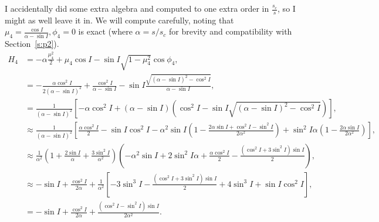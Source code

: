 \documentclass[11pt,
        usenames, %
        dvipsnames %
    ]{article}
\newcommand*{\p}[1]{\left(#1\right)}
\newcommand*{\s}[1]{\left[#1\right]}
\begin{document}
I accidentally did some extra algebra and computed to one extra order in
$\frac{s_c}{s}$, so I might as well leave it in. We will compute carefully,
noting that $\mu_4 = \frac{\cos I}{\alpha - \sin I}, \phi_4 = 0$ is exact (where
$\alpha = s/s_c$ for brevity and compatibility with Section~\ref{s:p2}).
\begin{align*}
    H_4 &= -\alpha \frac{\mu_4^2}{2} + \mu_4 \cos I - \sin I \sqrt{1 - \mu_4^2}
            \cos \phi_4,\\
        &= -\frac{\alpha \cos^2 I}{2(\alpha - \sin I)^2}
            + \frac{\cos^2 I}{\alpha - \sin I}
            - \sin I \frac{\sqrt{(\alpha - \sin I)^2 - \cos^2 I}}{
                \alpha - \sin I},\\
        &= \frac{1}{\p{\alpha - \sin I}^2}
            \s{-\alpha \cos^2 I + \p{\alpha - \sin I}
                \p{\cos^2 I - \sin I \sqrt{
                    (\alpha - \sin I)^2 - \cos^2 I}}},\\
        &\approx \frac{1}{\p{\alpha - \sin I}^2}
            \s{\frac{\alpha \cos^2 I}{2} -\sin I \cos^2 I - \alpha^2 \sin I
                \p{1 - \frac{2\alpha \sin I + \cos^2 I - \sin^2 I}{2\alpha^2}}
                + \sin^2 I\alpha\p{1 - \frac{2\alpha \sin I}{2\alpha^2}}},\\
        &\approx \frac{1}{\alpha^2}\p{1 + \frac{2\sin I}{\alpha}
            + \frac{3\sin^2 I}{\alpha^2}}\p{
                -\alpha^2 \sin I + 2\sin^2 I\alpha
                    + \frac{\alpha \cos^2 I}{2}
                    - \frac{(\cos^2 I + 3\sin^2 I)\sin I}{2}},\\
        &\approx -\sin I + \frac{\cos^2 I}{2\alpha}
            + \frac{1}{\alpha^2}\s{
                -3\sin^3 I - \frac{\p{\cos^2 I + 3\sin^2 I}\sin I}{2}
                    + 4\sin^3 I + \sin I \cos^2 I},\\
        &= -\sin I + \frac{\cos^2 I}{2\alpha}
            + \frac{\p{\cos^2 I - \sin^2 I}\sin I}{2\alpha^2}.
\end{align*}
\end{document}
